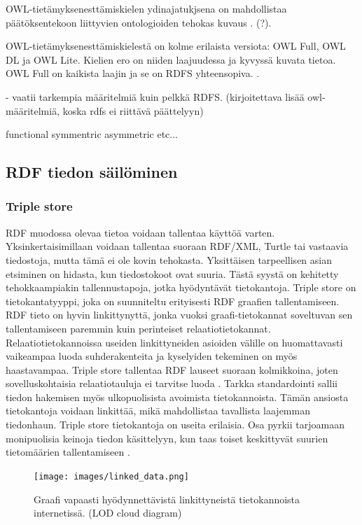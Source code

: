\documentclass[finnish, 12pt, a4paper, elec, utf8, pdfa, online]{aaltothesis}
\begin{document}
OWL-tietämyksenesttämiskielen ydinajatukjsena on mahdollistaa päätöksentekoon liittyvien ontologioiden tehokas kuvaus \cite{revisited}. (?).

OWL-tietämyksenesttämiskielestä on kolme erilaista versiota: OWL Full, OWL DL ja OWL Lite. Kielien ero on niiden laajuudessa ja kyvyssä kuvata tietoa. OWL Full on kaikista laajin ja se on RDFS yhteensopiva. \cite{OWL_specification}.

- vaatii tarkempia määritelmiä kuin pelkkä RDFS. (kirjoitettava lisää owl-määritelmiä, koska rdfs ei riittävä päättelyyn)

functional
symmentric
asymmetric
etc...

\subsection{RDF tiedon säilöminen}


\subsubsection{Triple store}
RDF muodossa olevaa tietoa voidaan tallentaa käyttöä varten. Yksinkertaisimillaan voidaan tallentaa suoraan RDF/XML, Turtle tai vastaavia tiedostoja, mutta tämä ei ole kovin tehokasta. Yksittäisen tarpeellisen asian etsiminen on hidasta, kun tiedostokoot ovat suuria. Tästä syystä on kehitetty tehokkaampiakin tallennustapoja, jotka hyödyntävät tietokantoja. Triple store on tietokantatyyppi, joka on suunniteltu erityisesti RDF graafien tallentamiseen. RDF tieto on hyvin linkittynyttä, jonka vuoksi graafi-tietokannat soveltuvan sen tallentamiseen paremmin kuin perinteiset relaatiotietokannat. Relaatiotietokannoissa useiden linkittyneiden asioiden välille on huomattavasti vaikeampaa luoda suhderakenteita ja kyselyiden tekeminen on myös haastavampaa. Triple store tallentaa RDF lauseet suoraan kolmikkoina, joten sovelluskohtaisia relaatiotauluja ei tarvitse luoda \cite{triplestore}. Tarkka standardointi sallii tiedon hakemisen myös ulkopuolisista avoimista tietokannoista. Tämän ansiosta tietokantoja voidaan linkittää, mikä mahdollistaa tavallista laajemman tiedonhaun. Triple store tietokantoja on useita erilaisia. Osa pyrkii tarjoamaan monipuolisia keinoja tiedon käsittelyyn, kun taas toiset keskittyvät suurien tietomäärien tallentamiseen \cite{revisited}.

\begin{figure}[htb]
\centering
\texttt{[image: images/linked\_data.png]}
\caption{Graafi vapaasti hyödynnettävistä linkittyneistä tietokannoista internetissä. (LOD cloud diagram) \cite{LOD_cloud} \label{images/linked_data}}
\end{figure}
\end{document}

